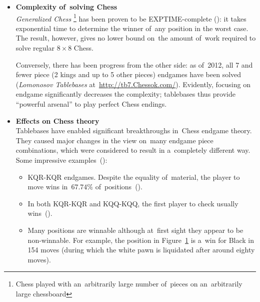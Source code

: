 \begin{itemize}
    \setlength\itemsep{-.5ex}
  \item \textbf{Complexity of~solving Chess}
    \\
    \emph{Generalized Chess}%
    \footnote{Chess played with an~arbitrarily large number of~pieces on an~arbitrarily large chessboard}
    has been proven to be EXPTIME-complete (\cite{Fraenkel1981computing}):
    it takes exponential time to determine the winner of~any position in the worst case.
    The result, however, gives no lower bound on~the amount of~work required to solve regular $8\times 8$ Chess.

    Conversely, there has been progress from the other side:
    as of~2012, all 7 and fewer piece (2 kings and up to 5 other pieces) endgames have been solved (\emph{Lomonosov Tablebases} at~\href{http://tb7.chessok.com/}{http://tb7.Chessok.com/}).
    Evidently, focusing on endgame significantly decreases the complexity; tablebases thus provide ``powerful arsenal'' to play perfect Chess endings.

  \item \textbf{Effects on Chess theory}
    \\
    Tablebases have enabled significant breakthroughs in~Chess endgame theory.
    They caused major changes in the view on~many endgame piece combinations, which were considered to result in a~completely different way.
    Some impressive examples~(\cite{wiki:Endgame_tablebase}):%
    \begin{itemize}
        \setlength\itemsep{-.5ex}
      \item KQR-KQR endgames.
        Despite the equality of~material, the player to move wins in~$67.74\%$ of~positions~(\cite{Haworth2001discarding}).

      \item In both KQR-KQR and KQQ-KQQ, the first player to check usually wins~(\cite[p.~379, 384]{Nunn2002secrets}).

      \item
        Many positions are winnable although at~first sight they appear to be non-winnable.
        For example, the position in Figure~\ref{fig:80-moves-to-liquidate-the-pawn} is a~win for Black in 154 moves (during which the white pawn is liquidated after around eighty moves).
        \begin{figure}
          \centering
          \newgame
          \showboard
          \label{fig:80-moves-to-liquidate-the-pawn}
        \end{figure}


\end{itemize}
\end{itemize}
